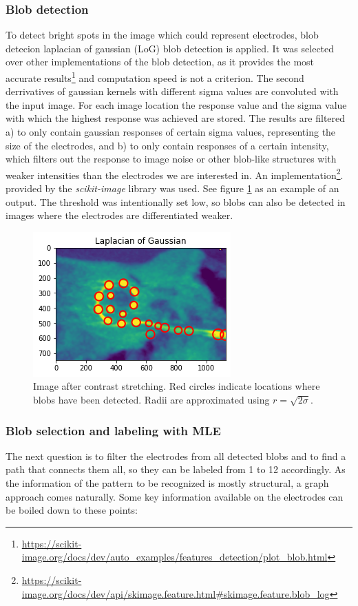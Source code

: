 \documentclass[a4paper, 11pt]{article}
\begin{document}
\subsubsection{Blob detection}
To detect bright spots in the image which could represent electrodes, blob detecion laplacian of gaussian (LoG) blob detection is applied. It was selected over other implementations of the blob detection, as it provides the most accurate results\footnote{\url{https://scikit-image.org/docs/dev/auto_examples/features_detection/plot_blob.html}} and computation speed is not a criterion. The second derrivatives of gaussian kernels with different sigma values are convoluted with the input image. For each image location the response value and the sigma value with which the highest response was achieved are stored. The results are filtered a) to only contain gaussian responses of certain sigma values, representing the size of the electrodes, and b) to only contain responses of a certain intensity, which filters out the response to image noise or other blob-like structures with weaker intensities than the electrodes we are interested in. An implementation\footnote{\url{https://scikit-image.org/docs/dev/api/skimage.feature.html#skimage.feature.blob_log}}.
provided by the \emph{scikit-image} \cite{scikit-image} library was used.
See figure \ref{blobs_detected} as an example of an output. The threshold was intentionally set low, so blobs can also be detected in images where the electrodes are differentiated weaker.

\begin{figure}[ht]
	\centering
  \includegraphics[width=.5\textwidth]{blobs_detected.png}
	\caption{Image after contrast stretching. Red circles indicate locations where blobs have been detected. Radii are approximated using $r=\sqrt{2\sigma}$.}
	\label{blobs_detected}
\end{figure}

\subsubsection{Blob selection and labeling with MLE}
The next question is to filter the electrodes from all detected blobs and to find a path that connects them all, so they can be labeled from 1 to 12 accordingly.  
As the information of the pattern to be recognized is mostly structural, a graph approach comes naturally. Some key information available on the electrodes can be boiled down to these points:
\end{document}
